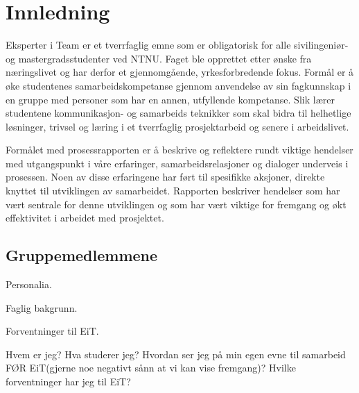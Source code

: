 \section{Innledning}
Eksperter i Team er et tverrfaglig emne som er obligatorisk for alle sivilingeniør- og mastergradsstudenter ved NTNU. Faget ble opprettet etter ønske fra næringslivet og har derfor et gjennomgående, yrkesforbredende fokus. Formål er å øke studentenes samarbeidskompetanse gjennom anvendelse av sin fagkunnskap i en gruppe med personer som har en annen, utfyllende kompetanse. Slik lærer studentene kommunikasjon- og samarbeids teknikker som skal bidra til helhetlige løsninger, trivsel og læring i et tverrfaglig prosjektarbeid og senere i arbeidslivet.

Formålet med prosessrapporten er å beskrive og reflektere rundt viktige hendelser med utgangspunkt i våre erfaringer, samarbeidsrelasjoner og dialoger underveis i prosessen. Noen av disse erfaringene har ført til spesifikke aksjoner, direkte knyttet til utviklingen av samarbeidet. Rapporten beskriver hendelser som har vært sentrale for denne utviklingen og som har vært viktige for fremgang og økt effektivitet i arbeidet med prosjektet.

\subsection{Gruppemedlemmene} %
Personalia.

Faglig bakgrunn.

Forventninger til EiT.

Hvem er jeg? Hva studerer jeg? Hvordan ser jeg på min egen evne til samarbeid FØR EiT(gjerne noe negativt sånn at vi kan vise fremgang)? Hvilke forventninger har jeg til EiT?

